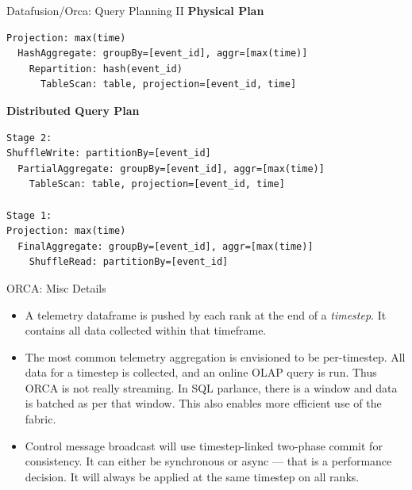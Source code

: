 \documentclass{beamer}
\begin{document}
\begin{frame}[fragile]{Datafusion/Orca: Query Planning II}
\textbf{Physical Plan}
    \begin{verbatim}
Projection: max(time)
  HashAggregate: groupBy=[event_id], aggr=[max(time)]
    Repartition: hash(event_id)
      TableScan: table, projection=[event_id, time]
    \end{verbatim}

  \textbf{Distributed Query Plan}
  \begin{verbatim}
Stage 2:
ShuffleWrite: partitionBy=[event_id]
  PartialAggregate: groupBy=[event_id], aggr=[max(time)]
    TableScan: table, projection=[event_id, time]

Stage 1:
Projection: max(time)
  FinalAggregate: groupBy=[event_id], aggr=[max(time)]
    ShuffleRead: partitionBy=[event_id]
  \end{verbatim}
\end{frame}

\begin{frame}{ORCA: Misc Details}
  \begin{itemize}
    \item A telemetry dataframe is pushed by each rank at the end of a \emph{timestep}. It contains all data collected within that timeframe.
    \item The most common telemetry aggregation is envisioned to be per-timestep. All data for a timestep is collected, and an online OLAP query is run. Thus ORCA is not really streaming. In SQL parlance, there is a window and data is batched as per that window. This also enables more efficient use of the fabric.
    \item Control message broadcast will use timestep-linked two-phase commit for consistency. It can either be synchronous or async --- that is a performance decision. It will always be applied at the same timestep on all ranks.
  \end{itemize}
\end{frame}
\end{document}
